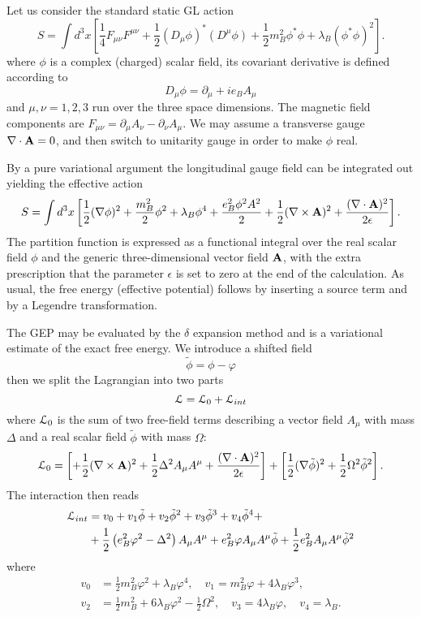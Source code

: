 \documentclass[aps,preprint]{revtex4}
\newcommand{\BE}{\begin{equation}}
\newcommand{\EE}{\end{equation}}
\begin{document}
Let us consider the standard static GL action\cite{kleinert}
\BE
S=\int d^{3}x \left[\frac{1}{4} F_{\mu \nu}F^{\mu
\nu}+\frac{1}{2}(D_{\mu}\phi)^{*}(D^{\mu}\phi)+
\frac{1}{2}m^{2}_{B}\phi^{*}\phi+
\lambda_{B}(\phi^{*}\phi)^{2}\right].
\label{gl}
\EE
where $\phi$ is a complex (charged) scalar field, its covariant
derivative is defined according to
\BE
D_{\mu}\phi = \partial_{\mu}+ie_{B} A_{\mu}
\label{derivative}
\EE
and $\mu,\nu=1,2,3$ run over the three space dimensions.
The magnetic field components are
$F_{\mu\nu}=\partial_\mu A_\nu-\partial_\nu A_\mu$. 
We may assume a transverse gauge $\nabla\cdot{\bf A}=0$, and then
switch to unitarity gauge in order to make $\phi$ real.

By a pure variational argument\cite{interpolation}
the longitudinal gauge field can be integrated out 
yielding the effective action
\BE
S=\int d^{3} x \left[
\frac{1}{2}(\nabla\phi)^{2}+\frac{m_{B}^{2}}{2}\phi^{2}
+\lambda_{B}\phi^{4}+\frac{e_{B}^{2}\phi^{2} A^2}{2}+
\frac{1}{2}({\nabla} \times {\bf A})^{2} 
+\frac{(\nabla\cdot{\bf A})^{2}}{2\epsilon}
\right].
\label{su2}
\EE
The partition function is expressed as a functional integral
over the real scalar field $\phi$ and the generic three-dimensional
vector field ${\bf A}$, with the extra prescription that the
parameter $\epsilon$ is set to zero at the end of the
calculation. As usual, the free energy (effective potential) follows by
inserting a source term and by a Legendre transformation\cite{gaussian,interpolation}.

The GEP may be evaluated
by the $\delta$ expansion method\cite{ibanez,stancu} and
is a variational
estimate of the exact free energy.
We introduce a shifted field
\BE
\tilde{\phi}=\phi-\varphi
\EE
then we split the Lagrangian into two parts
\BE
{\cal L}={\cal L}_0+{\cal L}_{int}
\EE
where ${\cal L}_0$ is the sum of two free-field terms
describing a vector field $A_\mu$ with mass $\Delta$ and
a real scalar field $\tilde \phi$ with mass $\Omega$:
\BE
{\cal L}_{0}=\left[
+\frac{1}{2}({\nabla} \times {\bf A})^{2} 
+\frac{1}{2} \Delta^{2} A_\mu A^\mu
+\frac{({\nabla}\cdot{\bf A})^{2}}{2\epsilon}
\right]
+\left[
\frac{1}{2}({\nabla}\tilde{\phi})^{2}
+\frac{1}{2}\Omega^{2}\tilde{\phi}^{2}
\right].
\label{L0}
\EE
The interaction then reads
\begin{align}
{\cal L}_{int}&=
v_{0}+v_{1}\tilde{\phi}+v_{2}\tilde{\phi}^{2}+v_{3}\tilde{\phi}^{3}
+v_{4}\tilde{\phi}^{4}+\nonumber\\
&+\frac{1}{2}\left(e_{B}^{2}\varphi^{2}-\Delta^{2}\right)A_\mu A^\mu
+e_{B}^{2}\varphi A_\mu A^\mu\tilde{\phi}
+\frac{1}{2}e^{2}_{B}A_\mu A^\mu\tilde{\phi}^{2}
\end{align}
where
\begin{align}
v_{0} &= \frac{1}{2}m_{B}^{2}\varphi^{2}+\lambda_{B}\varphi^{4},\quad
v_{1} = m_{B}^{2}\varphi+4\lambda_{B}\varphi^{3},\nonumber\\
v_{2} &= \frac{1}{2}m_{B}^{2}+6\lambda_{B}\varphi^{2}-\frac{1}{2}\Omega^{2},\quad
v_{3} = 4\lambda_{B}\varphi,\quad
v_{4} = \lambda_{B}.
\end{align}
\end{document}
